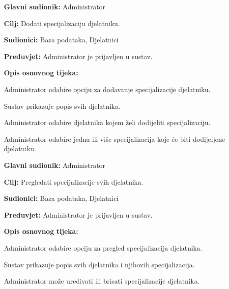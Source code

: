 \documentclass{article}
\begin{document}
\vspace{1em} %
\begin{packed_item}
\item \textbf{Glavni sudionik:} Administrator
\item \textbf{Cilj:} Dodati specijalizaciju djelatniku.
\item \textbf{Sudionici:} Baza podataka, Djelatnici
\item \textbf{Preduvjet:} Administrator je prijavljen u sustav.
\item \textbf{Opis osnovnog tijeka:}
\begin{packed_enum}
\item Administrator odabire opciju za dodavanje specijalizacije djelatniku.
\item Sustav prikazuje popis svih djelatnika.
\item Administrator odabire djelatnika kojem želi dodijeliti specijalizaciju.
\item Administrator odabire jednu ili više specijalizacija koje će biti dodijeljene djelatniku.
\end{packed_enum}
\end{packed_item}

\vspace{1em} %
\begin{packed_item}
\item \textbf{Glavni sudionik:} Administrator
\item \textbf{Cilj:} Pregledati specijalizacije svih djelatnika.
\item \textbf{Sudionici:} Baza podataka, Djelatnici
\item \textbf{Preduvjet:} Administrator je prijavljen u sustav.
\item \textbf{Opis osnovnog tijeka:}
\begin{packed_enum}
\item Administrator odabire opciju za pregled specijalizacija djelatnika.
\item Sustav prikazuje popis svih djelatnika i njihovih specijalizacija.
\item Administrator može uređivati ili brisati specijalizacije djelatnika.
\end{packed_enum}
\end{packed_item}
\end{document}
